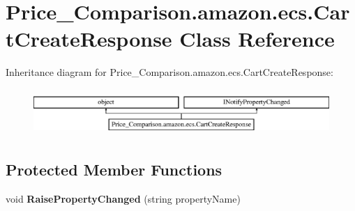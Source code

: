 \hypertarget{class_price___comparison_1_1amazon_1_1ecs_1_1_cart_create_response}{\section{Price\-\_\-\-Comparison.\-amazon.\-ecs.\-Cart\-Create\-Response Class Reference}
\label{class_price___comparison_1_1amazon_1_1ecs_1_1_cart_create_response}
}


 


Inheritance diagram for Price\-\_\-\-Comparison.\-amazon.\-ecs.\-Cart\-Create\-Response\-:\begin{figure}[H]
\begin{center}
\leavevmode
\includegraphics[height=1.772152cm]{class_price___comparison_1_1amazon_1_1ecs_1_1_cart_create_response}
\end{center}
\end{figure}
\subsection*{Protected Member Functions}
\begin{DoxyCompactItemize}
\item 
\hypertarget{class_price___comparison_1_1amazon_1_1ecs_1_1_cart_create_response_a88f5c3247784dbbbb05ed68a07b0cd4c}{void {\bfseries Raise\-Property\-Changed} (string property\-Name)}\label{class_price___comparison_1_1amazon_1_1ecs_1_1_cart_create_response_a88f5c3247784dbbbb05ed68a07b0cd4c}

\end{DoxyCompactItemize}
